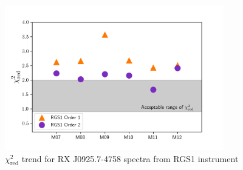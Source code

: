 			\begin{figure}[h!]
				\centering
				\caption{$\chi^2_\text{red}$ trend for RX J0925.7-4758 spectra from RGS1 instrument}
				\label{fig:mrvel-rgs1-chisq}
				\includegraphics[width=0.85\textwidth]{mrvel-rgs1-chisq}
			\end{figure}
		
